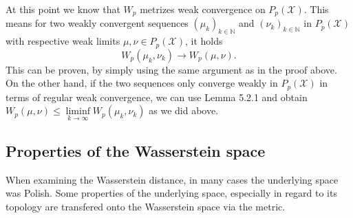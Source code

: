 \documentclass[11pt,a4paper]{article}
\begin{document}
\noindent{}At this point we know that $W_p$ metrizes weak convergence on $P_p(\mathcal{X})$. This means for two weakly convergent sequences $(\mu_k)_{k\in\mathbb{N}}$ and $(\nu_k)_{k\in\mathbb{N}}$ in $P_p(\mathcal{X})$ with respective weak limits $\mu,\nu\in{}P_p(\mathcal{X})$, it holds
\[
W_p(\mu_k,\nu_k)\rightarrow{}W_p(\mu,\nu).
\]
This can be proven, by simply using the same argument as in the proof above.\vspace{1em}\\
On the other hand, if the two sequences only converge weakly in $P_p(\mathcal{X})$ in terms of regular weak convergence, we can use Lemma 5.2.1 and obtain $W_p(\mu,\nu)\leq\liminf\limits_{k\rightarrow\infty}W_p(\mu_k,\nu_k)$ as we did above. 
\subsection{Properties of the Wasserstein space}
When examining the Wasserstein distance, in many cases the underlying space was Polish. Some properties of the underlying space, especially in regard to its topology are transfered onto the Wasserstein space via the metric.
\end{document}

